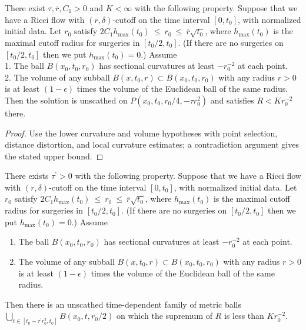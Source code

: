 \begin{proposition}
  \label{prop:kl-earlier-scalar-curvature-bounds-smaller-balls-from-lower-curvature-bound-existence-scalar-curvature}

There exist $\tau, \overline{r}, C_1 > 0$ and $K < \infty$
with the
following property. Suppose that we have a Ricci flow with $(r, \delta)$-cutoff
on the time interval $[0, t_0]$, with normalized initial data.  Let
$r_0$ satisfy
$2C_1 h_{\max}(t_0) \: \le \: r_0 \: \le \: \overline{r} \sqrt{t_0}$,
where $h_{\max}(t_0)$ is the maximal cutoff radius for surgeries in
$[t_0/2, t_0]$. (If there are no surgeries on $[t_0/2, t_0]$ then we put
$h_{\max}(t_0) = 0$.)
Assume \\
1. The ball $B(x_0, t_0, r_0)$ has sectional curvatures at least $- r_0^{-2}$
at each point. \\
2. The volume of any subball $B(x, t_0, r) \subset B(x_0, t_0, r_0)$ with
any radius $r > 0$ is at least $(1-\epsilon)$ times the volume of the
Euclidean ball of the same radius.\\

Then the solution is unscathed on
$P(x_0, t_0, r_0/4, - \tau r_0^2)$ and satisfies $R < K r_0^{-2}$
there.
\end{proposition}

\begin{proof}
\sketch Use the lower curvature and volume hypotheses with point selection, distance distortion, and local curvature estimates; a contradiction argument gives the stated upper bound.
\end{proof}

\begin{lemma}
  \label{lem:kl-earlier-scalar-curvature-bounds-smaller-balls-from-lower-curvature-bound-existence-scalar-curvature-6}
 \label{extra}
There exists $\tau^\prime > 0$
with the
following property. Suppose that we have a Ricci flow with $(r, \delta)$-cutoff
on the time interval $[0, t_0]$, with normalized initial data.  Let
$r_0$ satisfy
$2C_1 h_{\max}(t_0) \: \le \: r_0 \: \le \: \overline{r} \sqrt{t_0}$,
where $h_{\max}(t_0)$ is the maximal cutoff radius for surgeries in
$[t_0/2, t_0]$. (If there are no surgeries on $[t_0/2, t_0]$ then we put
$h_{\max}(t_0) = 0$.)
Assume
\begin{enumerate}
\item The ball $B(x_0, t_0, r_0)$ has sectional curvatures at least $- r_0^{-2}$
at each point.
\item The volume of any subball $B(x, t_0, r) \subset B(x_0, t_0, r_0)$ with
any radius $r > 0$ is at least $(1-\epsilon)$ times the volume of the
Euclidean ball of the same radius.
\end{enumerate}

Then there is an unscathed time-dependent family
of metric balls
$\bigcup_{t \in [t_0-\tau^\prime r_0^2, t_0]} B(x_0, t, r_0/2)$
on which the supremum of $R$ is less than $K r_0^{-2}$.
\end{lemma}

